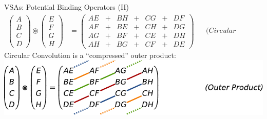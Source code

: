 \documentclass[handout,aspectratio=169]{beamer}
\newcommand{\CC}{\circledast}
\begin{document}
	\begin{frame}{VSAs: Potential Binding Operators (II)}
		\begin{align*}
		\begin{pmatrix}A \\ B \\ C \\ D\end{pmatrix} \CC \begin{pmatrix}E \\ F \\ G \\ H\end{pmatrix} &= \begin{pmatrix}AE &+& BH &+& CG &+& DF \\ AF &+& BE &+& CH &+& DG \\ AG &+& BF &+& CE &+& DH \\ AH &+& BG &+& CF &+& DE\end{pmatrix} && \textit{(Circular Convolution)}
		\end{align*}
		\vspace{0.25cm}
		Circular Convolution is a \enquote{compressed} outer product:\\[0.25cm]
		\hspace{0.7cm}\includegraphics{media/cconv_outer_product.pdf}
	\end{frame}
\end{document}

